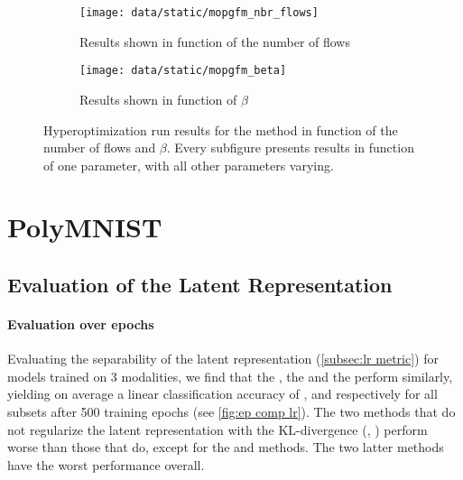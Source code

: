\begin{figure}
    \centering
    \begin{subfigure}[b]{0.9\textwidth}
        \centering
        \texttt{[image: data/static/mopgfm\_nbr\_flows]}
        \caption{Results shown in function of the number of flows}
        \label{subfig:mopgfm_nbr_flows}
    \end{subfigure}
    \hfill
    \begin{subfigure}[b]{0.9\textwidth}
        \centering
        \texttt{[image: data/static/mopgfm\_beta]}
        \caption{Results shown in function of $\beta$}
    \end{subfigure}
    \caption{Hyperoptimization run results for the  method in function of the number of flows and $\beta$. Every subfigure presents results in function of one parameter, with all other parameters varying.}
    \label{fig:mopgfm hyperopt2}
\end{figure}


\section{PolyMNIST} \label{subsec: results polymnist}

\subsection{Evaluation of the Latent Representation}

\paragraph{Evaluation over epochs}
Evaluating the separability of the latent representation (\cref{subsec:lr metric}) for models trained on 3 modalities, we find that the , the  and the  perform similarly, yielding on average a linear classification accuracy of ,  and  respectively for all subsets after 500 training epochs (see \cref{fig:ep comp lr}).
The two methods that do not regularize the latent representation with the KL-divergence (, ) perform worse than those that do, except for the  and  methods.
The two latter methods have the worst performance overall.


\begin{sansmath}
\end{sansmath}

